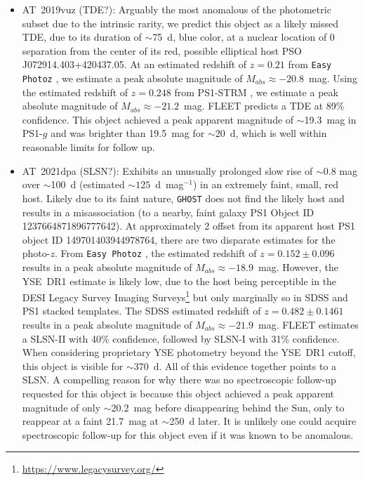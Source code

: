 \documentclass[twocolumn]{aastex63}
\begin{document}
\begin{itemize}
    \item AT~2019vuz (TDE?): Arguably the most anomalous of the photometric subset due to the intrinsic rarity, we predict this object as a likely missed TDE, due to its duration of $\sim$75~d, blue color, at a nuclear location of 0 separation from the center of its red, possible elliptical host PSO J072914.403+420437.05. At an estimated redshift of $z=0.21$ from \texttt{Easy Photoz} \citep{Aleo2023}, we estimate a peak absolute magnitude of $M_{abs}\approx-20.8$~mag. Using the estimated redshift of $z=0.248$ from PS1-STRM \citep{Beck2021}, we estimate a peak absolute magnitude of $M_{abs}\approx-21.2$~mag. FLEET \citep{Gomez2023TDE} predicts a TDE at 89\% confidence. This object achieved a peak apparent magnitude of $\sim$19.3~mag in PS1-$g$ and was brighter than 19.5~mag for $\sim$20~d, which is well within reasonable limits for follow up. 
    \item AT~2021dpa (SLSN?): Exhibits an unusually prolonged slow rise of $\sim$0.8 mag over $\sim$100~d (estimated $\sim125$~d~mag$^{-1}$) in an extremely faint, small, red host. Likely due to its faint nature, \texttt{GHOST} \citep{Gagliano2021} does not find the likely host and results in a misassociation (to a nearby, faint galaxy PS1 Object ID 1237664871896777642). At approximately 2 offset from its apparent host PS1 object ID 149701403944978764, there are two disparate estimates for the photo-$z$. From \texttt{Easy Photoz} \citep{Aleo2023}, the estimated redshift of $z=0.152 \pm 0.096$ results in a peak absolute magnitude of $M_{abs}\approx-18.9$~mag. However, the YSE~DR1 estimate is likely low, due to the host being perceptible in the DESI Legacy Survey Imaging Surveys\footnote{\url{https://www.legacysurvey.org/}} but only marginally so in SDSS and PS1 stacked templates. The SDSS estimated redshift of $z=0.482 \pm 0.1461$ \citep{Csabai2003} results in a peak absolute magnitude of $M_{abs}\approx-21.9$~mag. FLEET \citep{Gomez2023SLSN} estimates a SLSN-II with 40\% confidence, followed by SLSN-I with 31\% confidence. When considering proprietary YSE photometry beyond the YSE~DR1 cutoff, this object is visible for $\sim$370~d. All of this evidence together points to a SLSN. A compelling reason for why there was no spectroscopic follow-up requested for this object is because this object achieved a peak apparent magnitude of only $\sim$20.2~mag before disappearing behind the Sun, only to reappear at a faint 21.7~mag at $\sim$250~d later. It is unlikely one could acquire spectroscopic follow-up for this object even if it was known to be anomalous.

\end{itemize}
\end{document}
